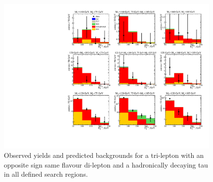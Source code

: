 \begin{figure}[htp]
\begin{center}
\includegraphics[width=1.0\textwidth]{plots/ossf1tau1.pdf}
\caption{Observed yields and predicted backgrounds for a tri-lepton with an opposite sign same flavour di-lepton and a hadronically decaying tau  in all defined search regions.}
\label{fig:OSSF1tau1}
\end{center}
\end{figure}

